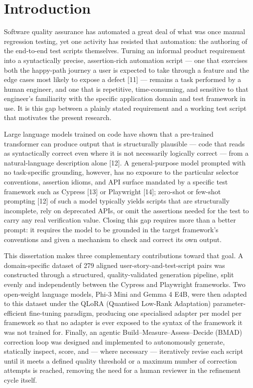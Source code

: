 \chapter{Introduction}

Software quality assurance has automated a great deal of what was once
manual regression testing, yet one activity has resisted that
automation: the authoring of the end-to-end test scripts themselves.
Turning an informal product requirement into a syntactically precise,
assertion-rich automation script --- one that exercises both the
happy-path journey a user is expected to take through a feature and the
edge cases most likely to expose a defect {[}11{]} --- remains a task
performed by a human engineer, and one that is repetitive,
time-consuming, and sensitive to that engineer's familiarity with the
specific application domain and test framework in use. It is this gap
between a plainly stated requirement and a working test script that
motivates the present research.

Large language models trained on code have shown that a pre-trained
transformer can produce output that is structurally plausible --- code
that reads as syntactically correct even where it is not necessarily
logically correct --- from a natural-language description alone
{[}12{]}. A general-purpose model prompted with no task-specific
grounding, however, has no exposure to the particular selector
conventions, assertion idioms, and API surface mandated by a specific
test framework such as Cypress {[}13{]} or Playwright {[}14{]};
zero-shot or few-shot prompting {[}12{]} of such a model typically
yields scripts that are structurally incomplete, rely on deprecated
APIs, or omit the assertions needed for the test to carry any real
verification value. Closing this gap requires more than a better prompt:
it requires the model to be grounded in the target framework's
conventions and given a mechanism to check and correct its own output.

This dissertation makes three complementary contributions toward that
goal. A domain-specific dataset of 279 aligned
user-story-and-test-script pairs was constructed through a structured,
quality-validated generation pipeline, split evenly and independently
between the Cypress and Playwright frameworks. Two open-weight language
models, Phi-3 Mini and Gemma 4 E4B, were then adapted to this dataset
under the QLoRA (Quantised Low-Rank Adaptation) parameter-efficient
fine-tuning paradigm, producing one specialised adapter per model per
framework so that no adapter is ever exposed to the syntax of the
framework it was not trained for. Finally, an agentic
Build--Measure--Assess--Decide (BMAD) correction loop was designed and
implemented to autonomously generate, statically inspect, score, and ---
where necessary --- iteratively revise each script until it meets a
defined quality threshold or a maximum number of correction attempts is
reached, removing the need for a human reviewer in the refinement cycle
itself.

